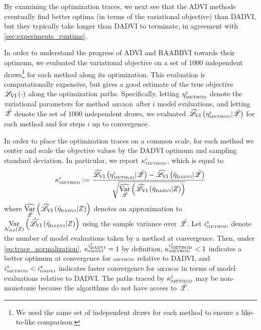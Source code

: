 \TracesARM{}
\TracesNonARM{}

By examining the optimization traces, we next see that the ADVI methods
eventually find better optima (in terms of the variational objective) than
DADVI, but they typically take longer than DADVI to terminate, in agreement with
\cref{sec:experiments_runtime}.

In order to understand the progress of ADVI and RAABBVI towards their optimum,
we evaluated the variational objective on a set of 1000 independent
draws\footnote{We used the same set of independent draws for each method
to ensure a like-to-like comparison.} for each method along its optimization.
This evaluation is computationally expensive, but gives a good estimate of the
true objective $\mathscr{L}_{\mathrm{VI}}\left(\cdot\right)$ along the optimization paths. Specifically,
letting $\eta^{i}_{\textrm{\tiny METHOD}}$ denote the variational parameters for method
$\textrm{\tiny METHOD}$ after $i$ model evaluations, and letting $\tilde{\mathscr{Z}}$ denote the set of 1000
independent draws, we evaluated $\widehat{\mathscr{L}}_{\mathrm{VI}}\left(\eta^{i}_{\textrm{\tiny METHOD}} \vert \tilde{\mathscr{Z}}\right)$ for
each method and for steps $i$ up to convergence.

In order to place the optimization traces on a common scale, for each
method we center and scale the objective values by the DADVI optimum
and sampling standard deviation. In particular, we report $\kappa^i_{\textrm{\tiny METHOD}}$,
which is equal to
%
\begin{align}\label{eq:trace_normalization}
%
\kappa^i_{\method} :=
\frac{
        \klobj{\eta^{i}_{\method} \vert \Zindep} -
        \klobj{\etahat_{\dadvi} \vert \Zindep}}
    {\sqrt{\varhat{\Zindep}{\klobj{\etahat_{\dadvi} \vert \z}}}}
%
\end{align}
%
where $\underset{\tilde{\mathscr{Z}}}{\widehat{\mathrm{Var}}}\left(\widehat{\mathscr{L}}_{\mathrm{VI}}\left(\hat{\eta}_{\textrm{\tiny DADVI}} \vert Z\right)\right)$ denotes an
approximation to $\underset{\mathcal{N}_{\mathrm{std}}\left(Z\right)}{\mathrm{Var}}\left(\widehat{\mathscr{L}}_{\mathrm{VI}}\left(\hat{\eta}_{\textrm{\tiny DADVI}} \vert Z\right)\right)$ using the
sample variance over $\tilde{\mathscr{Z}}$.  Let $i^*_{\textrm{\tiny METHOD}}$ denote the number of model
evaluations taken by a method at convergence.  Then, under
\cref{eq:trace_normalization}, $\kappa^{i^*_{\textrm{\tiny DADVI}}}_{\textrm{\tiny DADVI}} = 1$ by
definition, $\kappa^{i^*_{\textrm{\tiny METHOD}}}_{\textrm{\tiny METHOD}} < 1$ indicates a better optimum at
convergence for $\textrm{\tiny METHOD}$ relative to DADVI, and $i^*_{\textrm{\tiny METHOD}} < i^*_{\textrm{\tiny DADVI}}$
indicates faster convergence for $\textrm{\tiny METHOD}$ in terms of model evaluations
relative to DADVI.  The paths traced by $\kappa^i_{\textrm{\tiny METHOD}}$ may be
non-monotonic because the algorithms do not have access to $\tilde{\mathscr{Z}}$.

